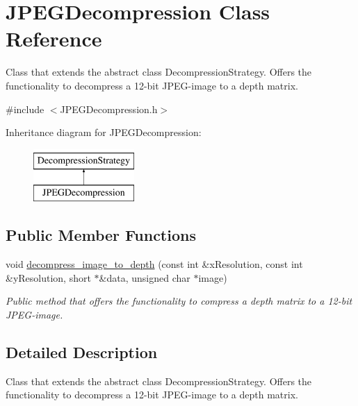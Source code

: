 \hypertarget{class_j_p_e_g_decompression}{\section{J\+P\+E\+G\+Decompression Class Reference}
\label{class_j_p_e_g_decompression}
}


Class that extends the abstract class Decompression\+Strategy. Offers the functionality to decompress a 12-\/bit J\+P\+E\+G-\/image to a depth matrix.  




{\ttfamily \#include $<$J\+P\+E\+G\+Decompression.\+h$>$}

Inheritance diagram for J\+P\+E\+G\+Decompression\+:\begin{figure}[H]
\begin{center}
\leavevmode
\includegraphics[height=2.000000cm]{class_j_p_e_g_decompression}
\end{center}
\end{figure}
\subsection*{Public Member Functions}
\begin{DoxyCompactItemize}
\item 
void \hyperlink{class_j_p_e_g_decompression_ad9f3e806d9e86a5333f37929c385496c}{decompress\+\_\+image\+\_\+to\+\_\+depth} (const int \&x\+Resolution, const int \&y\+Resolution, short $\ast$\&data, unsigned char $\ast$image)
\begin{DoxyCompactList}\small\item\em Public method that offers the functionality to compress a depth matrix to a 12-\/bit J\+P\+E\+G-\/image. \end{DoxyCompactList}\end{DoxyCompactItemize}


\subsection{Detailed Description}
Class that extends the abstract class Decompression\+Strategy. Offers the functionality to decompress a 12-\/bit J\+P\+E\+G-\/image to a depth matrix. 

